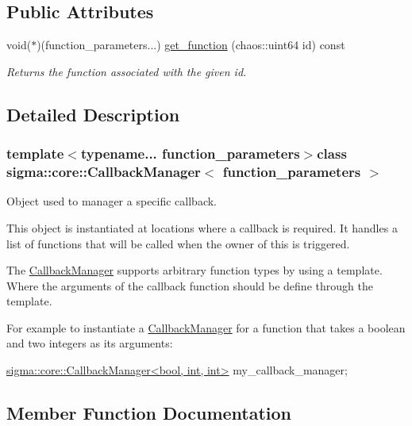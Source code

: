 \subsection*{Public Attributes}
\begin{DoxyCompactItemize}
\item 
void($\ast$)(function\+\_\+parameters...) \hyperlink{classsigma_1_1core_1_1_callback_manager_a3c36f3c32e2d6ea0f395f6bdd8775039}{get\+\_\+function} (chaos\+::uint64 id) const
\begin{DoxyCompactList}\small\item\em Returns the function associated with the given id. \end{DoxyCompactList}\end{DoxyCompactItemize}


\subsection{Detailed Description}
\subsubsection*{template$<$typename... function\+\_\+parameters$>$class sigma\+::core\+::\+Callback\+Manager$<$ function\+\_\+parameters $>$}

Object used to manager a specific callback. 

This object is instantiated at locations where a callback is required. It handles a list of functions that will be called when the owner of this is triggered.

The \hyperlink{classsigma_1_1core_1_1_callback_manager}{Callback\+Manager} supports arbitrary function types by using a template. Where the arguments of the callback function should be define through the template.

For example to instantiate a \hyperlink{classsigma_1_1core_1_1_callback_manager}{Callback\+Manager} for a function that takes a boolean and two integers as its arguments\+:


\begin{DoxyCode}
\hyperlink{classsigma_1_1core_1_1_callback_manager}{sigma::core::CallbackManager<bool, int, int>} 
      my\_callback\_manager;
\end{DoxyCode}
 

\subsection{Member Function Documentation}
\hypertarget{classsigma_1_1core_1_1_callback_manager_a7dbb06902d49789afc466a3ecbacbfe2}{}
